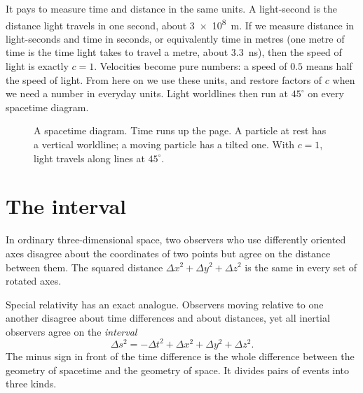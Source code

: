 It pays to measure time and distance in the same units. A light-second is the
distance light travels in one second, about \SI{3e8}{\metre}. If we measure
distance in light-seconds and time in seconds, or equivalently time in metres
(one metre of time is the time light takes to travel a metre, about
\SI{3.3}{\nano\second}), then the speed of light is exactly $c = 1$. Velocities
become pure numbers: a speed of $0.5$ means half the speed of light. From here
on we use these units, and restore factors of $c$ when we need a number in
everyday units. Light worldlines then run at $45^{\circ}$ on every spacetime
diagram.

\begin{figure}[htbp]
\centering
{}
\caption{A spacetime diagram. Time runs up the page. A particle at rest has a
vertical worldline; a moving particle has a tilted one. With $c = 1$, light
travels along lines at $45^{\circ}$.}
\label{fig:spacetime-diagram}
\end{figure}

\section{The interval}\label{sec:interval}

In ordinary three-dimensional space, two observers who use differently
oriented axes disagree about the coordinates of two points but agree on the
distance between them. The squared distance
$\Delta x^{2} + \Delta y^{2} + \Delta z^{2}$ is the same in every set of
rotated axes.

Special relativity has an exact analogue. Observers moving relative to one
another disagree about time differences and about distances, yet all inertial
observers agree on the \emph{interval}
\begin{equation}
  \Delta s^{2} = -\Delta t^{2} + \Delta x^{2} + \Delta y^{2} + \Delta z^{2}.
  \label{eq:interval}
\end{equation}
The minus sign in front of the time difference is the whole difference between
the geometry of spacetime and the geometry of space. It divides pairs of events
into three kinds.

